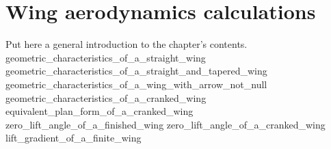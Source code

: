 \documentclass[[12pt,twoside]{book}
\begin{document}
%
%
\chapter%
   [Wing aerodynamics calculations]%
   {Wing aerodynamics calculations}
\label{chap:Wing}

\setcounter{minitocdepth}{2}%
\minitoc %

\vspace{\baselineskip}

\noindent
Put here a general introduction to the chapter's contents.
%
{geometric_characteristics_of_a_straight_wing}
{geometric_characteristics_of_a_straight_and_tapered_wing}
{geometric_characteristics_of_a_wing_with_arrow_not_null}
{geometric_characteristics_of_a_cranked_wing}
{equivalent_plan_form_of_a_cranked_wing}
{zero_lift_angle_of_a_finished_wing}
{zero_lift_angle_of_a_cranked_wing}
{lift_gradient_of_a_finite_wing}
\end{document}
